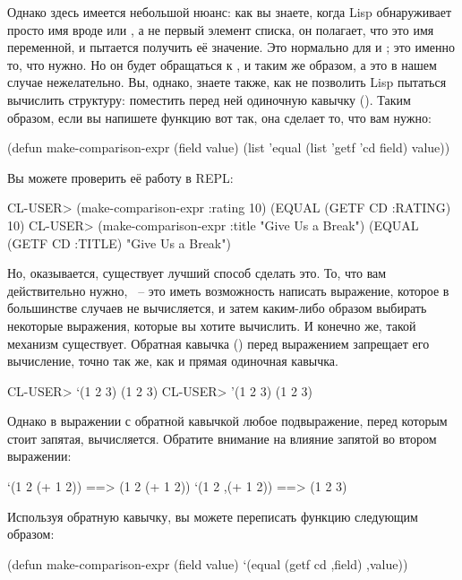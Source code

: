 Однако здесь имеется небольшой нюанс: как вы знаете, когда Lisp обнаруживает просто имя
вроде  или , а не первый элемент списка, он полагает, что это имя
переменной, и пытается получить её значение. Это нормально для  и
; это именно то, что нужно. Но он будет обращаться к , 
и  таким же образом, а это в нашем случае нежелательно. Вы, однако, знаете также,
как не позволить Lisp пытаться вычислить структуру: поместить перед ней одиночную кавычку
(). Таким образом, если вы напишете функцию  вот так,
она сделает то, что вам нужно:

\begin{myverb}
(defun make-comparison-expr (field value)
  (list 'equal (list 'getf 'cd field) value))
\end{myverb}

Вы можете проверить её работу в REPL:

\begin{myverb}
  CL-USER> (make-comparison-expr :rating 10)
  (EQUAL (GETF CD :RATING) 10)
  CL-USER> (make-comparison-expr :title "Give Us a Break")
  (EQUAL (GETF CD :TITLE) "Give Us a Break")
\end{myverb}

Но, оказывается, существует лучший способ сделать это. То, что вам действительно нужно,
~-- это иметь возможность написать выражение, которое в большинстве случаев не
вычисляется, и затем каким-либо образом выбирать некоторые выражения, которые вы хотите
вычислить. И конечно же, такой механизм существует. Обратная кавычка () перед
выражением запрещает его вычисление, точно так же, как и прямая одиночная кавычка.

\begin{myverb}
  CL-USER> `(1 2 3)
  (1 2 3)
  CL-USER> '(1 2 3)
  (1 2 3)
\end{myverb}

Однако в выражении с обратной кавычкой любое подвыражение, перед которым стоит запятая,
вычисляется. Обратите внимание на влияние запятой во втором выражении:

\begin{myverb}
  `(1 2 (+ 1 2))  ==> (1 2 (+ 1 2))
  `(1 2 ,(+ 1 2)) ==> (1 2 3)
\end{myverb}

Используя обратную кавычку, вы можете переписать функцию  следующим образом:

\begin{myverb}
(defun make-comparison-expr (field value)
  `(equal (getf cd ,field) ,value))
\end{myverb}

